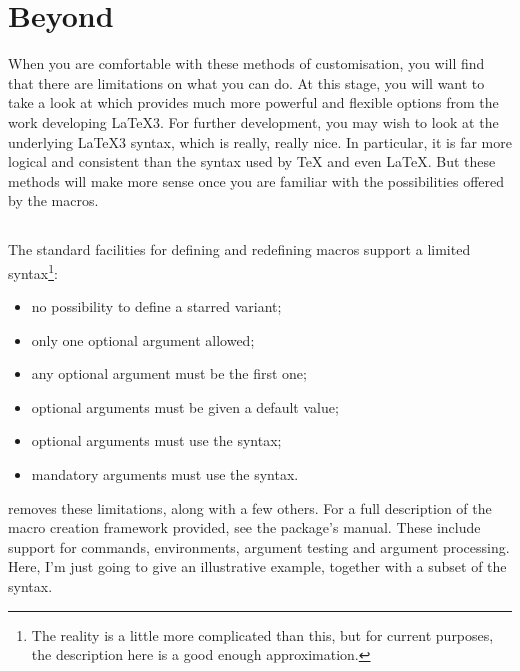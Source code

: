 

\section<1-| beamer:0>{Beyond \LaTeXe}\label{sec:beyond2e}


When you are comfortable with these methods of customisation, you will find that there are limitations on what you can do.
At this stage, you will want to take a look at  which provides much more powerful and flexible options from the work developing \LaTeX 3.
For further development, you may wish to look at the underlying \LaTeX 3 syntax, which is really, really nice.
In particular, it is far more logical and consistent than the syntax used by \TeX{} and even \LaTeX{}.
But these methods will make more sense once you are familiar with the possibilities offered by the \LaTeXe{} macros.

\subsection[xparse]{\protect{}}\label{subsec:xparse}


The standard \LaTeXe{} facilities for defining and redefining macros support a limited syntax\footnote{%
  The reality is a little more complicated than this, but for current purposes, the description here is a good enough approximation.%
}:
\begin{itemize}
  \item no possibility to define a starred variant;
  \item only one optional argument allowed;
  \item any optional argument must be the first one;
  \item optional arguments must be given a default value;
  \item optional arguments must use the  syntax;
  \item mandatory arguments must use the  syntax.
\end{itemize}
 removes these limitations, along with a few others.
For a full description of the macro creation framework provided, see the package's manual.
These include support for commands, environments, argument testing and argument processing.
Here, I'm just going to give an illustrative example, together with a subset of the syntax.

